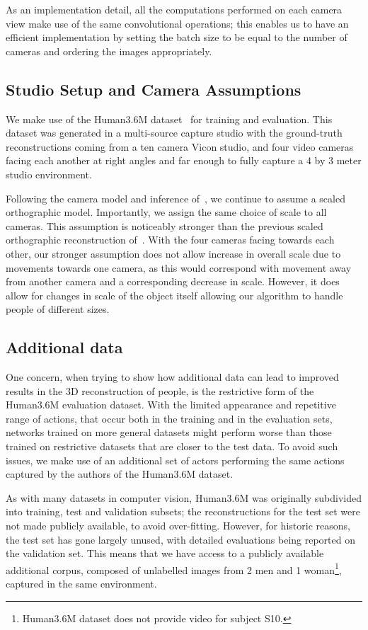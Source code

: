 \documentclass[10pt,twocolumn,letterpaper]{article}
\begin{document}
As an implementation detail, all the computations performed on each
camera view make use of the same convolutional operations; this
enables us to have an efficient implementation by setting the batch
size to be equal to the number of cameras and ordering the images
appropriately.

 \subsection{Studio Setup and Camera Assumptions}
\label{sec:studio-setup-camera}
  We make use of the Human3.6M dataset~\cite{ionescu2014human3} for
  training and evaluation.  This dataset was generated in a
  multi-source capture studio with the ground-truth reconstructions
  coming from a ten camera Vicon studio, and four video cameras facing
  each another at right angles and far enough to fully capture a 4 by
  3 meter studio environment.

 Following the camera model and inference of~\cite{tome2017lifting}, we continue
 to assume a scaled orthographic model. Importantly, we assign the same choice
 of scale to all cameras. This assumption is noticeably stronger than the
 previous scaled orthographic reconstruction of~\cite{tome2017lifting}.
With the four cameras facing
 towards each other, our stronger assumption does not allow increase in overall scale
 due to movements towards one camera, as this would correspond with movement away
 from another camera and a corresponding decrease in scale. However, it does
 allow for changes in scale of the object itself allowing our algorithm to
 handle people of different sizes.



 \subsection{Additional data}
 \label{sec:additional-data}
 One concern, when trying to show how additional data can lead to improved
 results in the 3D reconstruction of people, is the restrictive form of the
 Human3.6M evaluation dataset. With the limited appearance and repetitive
 range of actions, that occur both in the training and in the evaluation sets,
 networks trained on more general datasets might perform worse than those
 trained on restrictive datasets that are closer to the test data. To avoid such
 issues, we make use of an additional set of actors performing the same actions
 captured by the authors of the Human3.6M dataset.

As with many datasets  in computer vision,  Human3.6M was
originally subdivided into training, test and validation subsets; the
reconstructions for the test set were not made publicly available, to avoid
over-fitting. However, for historic reasons, the test set has gone largely
unused, with detailed evaluations being reported on the validation set. This
means that we have access to a publicly available additional corpus, composed of
unlabelled images from 2 men and 1 woman\footnote{Human3.6M dataset does not
  provide video for subject S10.}, captured in the same environment.
\end{document}
